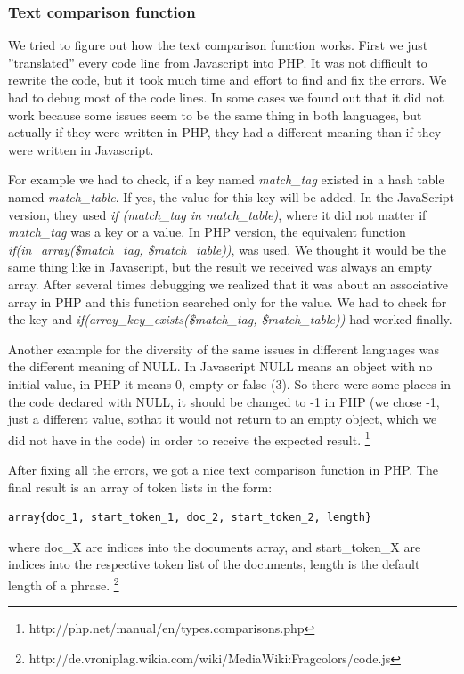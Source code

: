 \subsubsection{Text comparison function}

We tried to figure out how the text comparison function works. First we just ''translated'' every code line from Javascript into PHP. It was not difficult to rewrite the code, but it took much time and effort to find and fix the errors. We had to debug most of  the code lines. In some cases we found out that it did not work because some issues seem to be the same thing in both languages, but actually if they were written in PHP, they had a different meaning than if they were written in Javascript.

For example we had to check, if a key named \textit{match\_tag} existed in a hash table named \textit{match\_table}. If yes, the value for this key will be added. In the JavaScript version, they used \textit{if (match\_tag in match\_table)}, where it did not matter if \textit{match\_tag} was a key or a value. In PHP version, the equivalent function \textit{if(in\_array(\$match\_tag, \$match\_table))}, was used. We thought it would be the same thing like in Javascript, but the result we received was always an empty array. After several times debugging we realized that it was about an associative array in PHP and this function searched only for the value. We had to check for the key and \textit{if(array\_key\_exists(\$match\_tag, \$match\_table))} had worked finally.

Another example for the diversity of the same issues in different languages was the different meaning of NULL. In Javascript NULL means an object with no initial value, in PHP it means 0, empty or false (3). So there were some places in the code declared with NULL, it should be changed to -1 in PHP (we chose -1, just a different value, sothat it would not return to an empty object, which we did not have in the code) in order to receive the expected result. 
\footnote{http://php.net/manual/en/types.comparisons.php}

After fixing all the errors, we got a nice text comparison function in PHP. The final result is an array of token lists in the form:

\begin{lstlisting}
array{doc_1, start_token_1, doc_2, start_token_2, length} 
\end{lstlisting}

where doc\_X are indices into the documents array, and start\_token\_X are indices into the respective token list of the documents, length is the default length of a phrase. 
\footnote{http://de.vroniplag.wikia.com/wiki/MediaWiki:Fragcolors/code.js}

